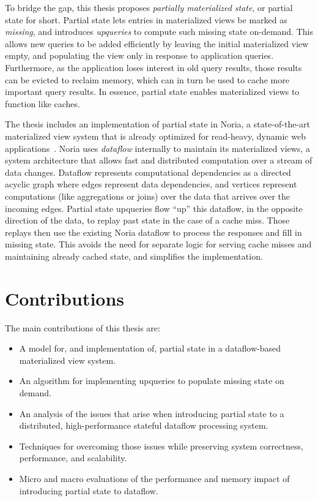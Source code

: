 To bridge the gap, this thesis proposes \textit{partially materialized state},
or partial state for short. Partial state lets entries in materialized views be
marked as \textit{missing}, and introduces \textit{upqueries} to compute such
missing state on-demand. This allows new queries to be added efficiently by
leaving the initial materialized view empty, and populating the view only in
response to application queries. Furthermore, as the application loses interest
in old query results, those results can be evicted to reclaim memory, which can
in turn be used to cache more important query results. In essence, partial state
enables materialized views to function like caches.

The thesis includes an implementation of partial state in Noria, a
state-of-the-art materialized view system that is already optimized for
read-heavy, dynamic web applications~\cite{noria}. Noria uses \textit{dataflow}
internally to maintain its materialized views, a system architecture that allows
fast and distributed computation over a stream of data changes. Dataflow
represents computational dependencies as a directed acyclic graph where edges
represent data dependencies, and vertices represent computations (like
aggregations or joins) over the data that arrives over the incoming edges.
Partial state upqueries flow ``up'' this dataflow, in the opposite direction of
the data, to replay past state in the case of a cache miss. Those replays then
use the existing Noria dataflow to process the responses and fill in missing
state. This avoids the need for separate logic for serving cache misses and
maintaining already cached state, and simplifies the implementation.

\section{Contributions}

The main contributions of this thesis are:

\begin{itemize}
 \item A model for, and implementation of, partial state in a dataflow-based
   materialized view system.
 \item An algorithm for implementing upqueries to populate missing state on
   demand.
 \item An analysis of the issues that arise when introducing partial state to a
   distributed, high-performance stateful dataflow processing system.
 \item Techniques for overcoming those issues while preserving system
	 correctness, performance, and scalability.
 \item Micro and macro evaluations of the performance and memory impact of
	 introducing partial state to dataflow.
\end{itemize}

